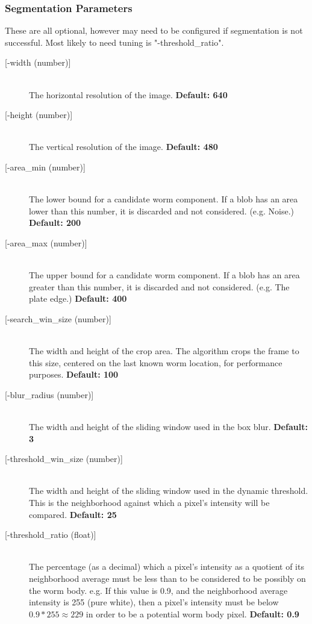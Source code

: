 \documentclass[]{article}
\begin{document}
\subsubsection{Segmentation Parameters}
These are all optional, however may need to be configured if segmentation is not successful. Most likely to need tuning is "-threshold\_ratio".

\begin{description}
	\item[{[-width (number)]}] \hfill \\
	The horizontal resolution of the image. \textbf{Default: 640}
	\item[{[-height (number)]}] \hfill \\
	The vertical resolution of the image. \textbf{Default: 480}
	\item[{[-area\_min (number)]}] \hfill \\
	The lower bound for a candidate worm component. If a blob has an area lower than this number, it is discarded and not considered. (e.g. Noise.) \textbf{Default: 200}
	\item[{[-area\_max (number)]}] \hfill \\
	The upper bound for a candidate worm component. If a blob has an area greater than this number, it is discarded and not considered. (e.g. The plate edge.) \textbf{Default: 400}
	\item[{[-search\_win\_size (number)]}] \hfill \\
	The width and height of the crop area. The algorithm crops the frame to this size, centered on the last known worm location, for performance purposes. \textbf{Default: 100}
	\item[{[-blur\_radius (number)]}] \hfill \\
	The width and height of the sliding window used in the box blur. \textbf{Default: 3}
	\item[{[-threshold\_win\_size (number)]}] \hfill \\
	The width and height of the sliding window used in the dynamic threshold. This is the neighborhood against which a pixel's intensity will be compared. \textbf{Default: 25}
	\item[{[-threshold\_ratio (float)]}] \hfill \\
	The percentage (as a decimal) which a pixel's intensity as a quotient of its neighborhood average must be less than to be considered to be possibly on the worm body. e.g. If this value is 0.9, and the neighborhood average intensity is 255 (pure white), then a pixel's intensity must be below \(0.9 * 255 \approx 229\) in order to be a potential worm body pixel.  \textbf{Default: 0.9}
	
\end{description}
\end{document}
